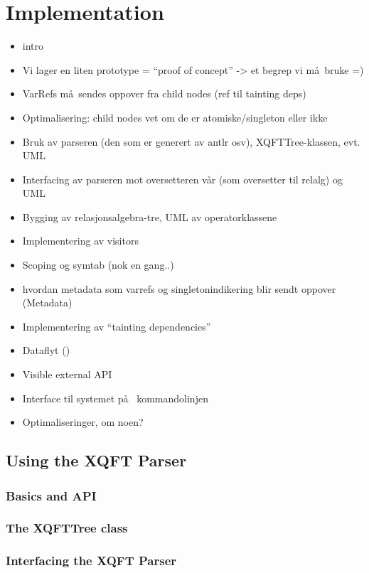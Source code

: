 \chapter{Implementation}
\label{chapter:implementation}

\begin{itemize}
  \item intro
  \item Vi lager en liten prototype = ``proof of concept'' -> et begrep vi m\aa~bruke =)
  \item VarRefs m\aa~sendes oppover fra child nodes (ref til tainting deps)
  \item Optimalisering: child nodes vet om de er atomiske/singleton eller ikke
\end{itemize}

\begin{itemize}
  \item Bruk av parseren (den som er generert av antlr osv), XQFTTree-klassen,
  evt. UML
  \item Interfacing av parseren mot oversetteren v\aa r (som oversetter til
  relalg) og UML
  \item Bygging av relasjonsalgebra-tre, UML av operatorklassene
  \item Implementering av visitors
  \item Scoping og symtab (nok en gang..)
  \item hvordan metadata som varrefs og singletonindikering blir sendt oppover
  (Metadata)
  \item Implementering av ``tainting dependencies''
  \item Dataflyt ()
  \item Visible external API
  \item Interface til systemet p\aa~ kommandolinjen
  \item Optimaliseringer, om noen? 
\end{itemize}


\section{Using the XQFT Parser}
\subsection{Basics and API}
\subsection{The XQFTTree class}
\subsection{Interfacing the XQFT Parser}

